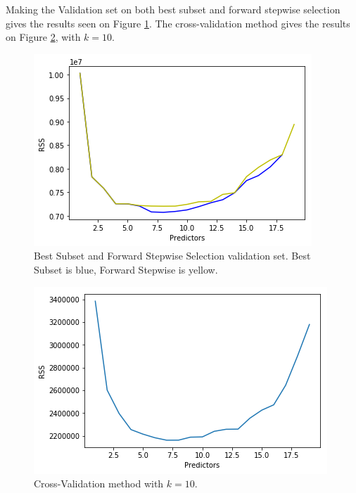 Making the Validation set on both best subset and forward stepwise selection gives the results seen on Figure \ref{fig:validatedBestSubsetAndForwardStepwise}. The cross-validation method gives the results on Figure \ref{fig:crossValidationRSS}, with $k=10$.

\begin{figure}[h]
	\centering
	\includegraphics[scale=0.4]{subsetSelection/modelQualification/fig/validatedBestSubsetAndForwardStepwise.png}
	\caption{Best Subset and Forward Stepwise Selection validation set. Best Subset is blue, Forward Stepwise is yellow.}
	\label{fig:validatedBestSubsetAndForwardStepwise}
\end{figure}

\begin{figure}[h]
	\centering
	\includegraphics[scale=0.4]{subsetSelection/modelQualification/fig/crossValidation.png}
	\caption{Cross-Validation method with $k=10$.}
	\label{fig:crossValidationRSS}
\end{figure}
